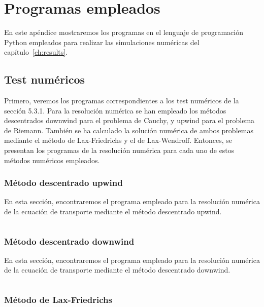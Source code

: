 \chapter{Programas empleados}

En este apéndice mostraremos los programas en el lenguaje de
programación Python empleados para realizar las simulaciones
numéricas del capítulo~\ref{ch:results}.

\section{Test numéricos}

Primero, veremos los programas correspondientes a los test numéricos
de la sección 5.3.1.
Para la resolución numérica se han empleado los métodos descentrados
downwind para el problema de Cauchy, y upwind para el problema de
Riemann.
También se ha calculado la solución numérica de ambos problemas
mediante el método de Lax-Friedrichs y el de Lax-Wendroff.
Entonces, se presentan los programas de la resolución numérica
para cada uno de estos métodos numéricos empleados.

\subsection{Método descentrado upwind}

En esta sección, encontraremos el programa empleado para la
resolución numérica de la ecuación de transporte mediante el método
descentrado upwind.

\begin{listing}[ht!]
    \footnotesize
    \centering
    \inputminted[firstline=3,lastline=4]{python}{figure1.py}
\end{listing}

\subsection{Método descentrado downwind}

En esta sección, encontraremos el programa empleado para la
resolución numérica de la ecuación de transporte mediante el método
descentrado downwind.

\begin{listing}[ht!]
    \footnotesize
    \centering
    \inputminted[firstline=3,lastline=4]{python}{figure1.py}
\end{listing}

\subsection{Método de Lax-Friedrichs}

